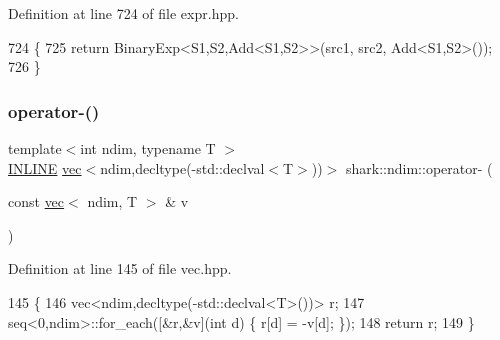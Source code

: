 Definition at line 724 of file expr.\+hpp.


\begin{DoxyCode}
724                                                                                                            
                                              \{
725             \textcolor{keywordflow}{return} BinaryExp<S1,S2,Add<S1,S2>>(src1, src2, Add<S1,S2>());
726         \}
\end{DoxyCode}
\hypertarget{namespaceshark_1_1ndim_abcf5c67c28690043fa9829afb1b617fb}{}\label{namespaceshark_1_1ndim_abcf5c67c28690043fa9829afb1b617fb} 
\subsubsection{\texorpdfstring{operator-\/()}{operator-()}\hspace{0.1cm}{\footnotesize\ttfamily [1/8]}}
{\footnotesize\ttfamily template$<$int ndim, typename T $>$ \\
\hyperlink{common_8hpp_a2eb6f9e0395b47b8d5e3eeae4fe0c116}{I\+N\+L\+I\+NE} \hyperlink{structshark_1_1ndim_1_1vec}{vec}$<$ndim,decltype(-\/std\+::declval$<$T$>$))$>$ shark\+::ndim\+::operator-\/ (\begin{DoxyParamCaption}\item[{const \hyperlink{structshark_1_1ndim_1_1vec}{vec}$<$ ndim, T $>$ \&}]{v }\end{DoxyParamCaption})\hspace{0.3cm}{\ttfamily [inline]}}



Definition at line 145 of file vec.\+hpp.


\begin{DoxyCode}
145                                                                                     \{
146             vec<ndim,decltype(-std::declval<T>())> r;
147             seq<0,ndim>::for\_each([&r,&v](\textcolor{keywordtype}{int} d) \{ r[d] = -v[d]; \});
148             \textcolor{keywordflow}{return} r;
149         \}
\end{DoxyCode}
\hypertarget{namespaceshark_1_1ndim_a562ed7a1dc9951ae1674a1988710171c}{}\label{namespaceshark_1_1ndim_a562ed7a1dc9951ae1674a1988710171c} 

